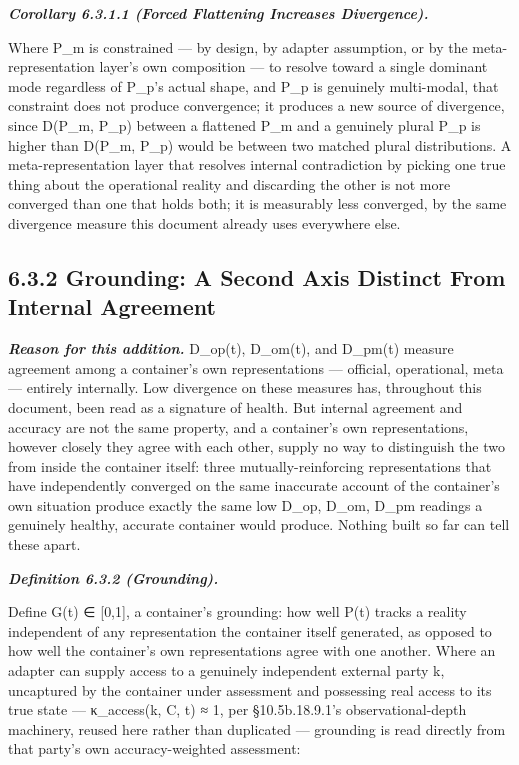 \documentclass[
]{article}
\begin{document}
\emph{\textbf{Corollary 6.3.1.1 (Forced Flattening Increases
Divergence).}}

Where P\_m is constrained --- by design, by adapter assumption, or by
the meta-representation layer's own composition --- to resolve toward a
single dominant mode regardless of P\_p's actual shape, and P\_p is
genuinely multi-modal, that constraint does not produce convergence; it
produces a new source of divergence, since D(P\_m, P\_p) between a
flattened P\_m and a genuinely plural P\_p is higher than D(P\_m, P\_p)
would be between two matched plural distributions. A meta-representation
layer that resolves internal contradiction by picking one true thing
about the operational reality and discarding the other is not more
converged than one that holds both; it is measurably less converged, by
the same divergence measure this document already uses everywhere else.

\hypertarget{grounding-a-second-axis-distinct-from-internal-agreement}{%
\subsection{6.3.2 Grounding: A Second Axis Distinct From Internal
Agreement}\label{grounding-a-second-axis-distinct-from-internal-agreement}}

\emph{\textbf{Reason for this addition.}} D\_op(t), D\_om(t), and
D\_pm(t) measure agreement among a container's own representations ---
official, operational, meta --- entirely internally. Low divergence on
these measures has, throughout this document, been read as a signature
of health. But internal agreement and accuracy are not the same
property, and a container's own representations, however closely they
agree with each other, supply no way to distinguish the two from inside
the container itself: three mutually-reinforcing representations that
have independently converged on the same inaccurate account of the
container's own situation produce exactly the same low D\_op, D\_om,
D\_pm readings a genuinely healthy, accurate container would produce.
Nothing built so far can tell these apart.

\emph{\textbf{Definition 6.3.2 (Grounding).}}

Define G(t) ∈ {[}0,1{]}, a container's grounding: how well P(t) tracks a
reality independent of any representation the container itself
generated, as opposed to how well the container's own representations
agree with one another. Where an adapter can supply access to a
genuinely independent external party k, uncaptured by the container
under assessment and possessing real access to its true state ---
κ\_access(k, C, t) ≈ 1, per §10.5b.18.9.1's observational-depth
machinery, reused here rather than duplicated --- grounding is read
directly from that party's own accuracy-weighted assessment:
\end{document}
